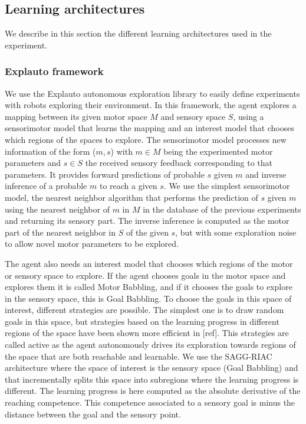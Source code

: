 \documentclass[10pt,letterpaper]{article}
\begin{document}
		
	
	\subsection{Learning architectures}

		We describe in this section the different learning architectures used in the experiment. 
		
		\subsubsection{Explauto framework}
			
			We use the Explauto autonomous exploration library \cite{moulin-frier_explauto:_2014} to easily define experiments with robots exploring their environment. 
			In this framework, the agent explores a mapping between its given motor space $M$ and sensory space $S$, 
			using a sensorimotor model that learns the mapping and an interest model that chooses which regions of the spaces to explore.
			The sensorimotor model processes new information of the form ($m, s$) with $m \in M$ being the experimented motor parameters and $s \in S$ the received sensory feedback 
			corresponding to that parameters. 
			It provides forward predictions of probable $s$ given $m$ and inverse inference of a probable $m$ to reach a given $s$.
			We use the simplest sensorimotor model, the nearest neighbor algorithm 
			that performs the prediction of $s$ given $m$ using the nearest neighbor of $m$ in $M$ in the database of the previous experiments and returning its sensory part. 
			The inverse inference is computed as the motor part of the nearest neighbor in $S$ of the given $s$, but with some exploration noise to allow novel motor parameters to be explored.
			
			The agent also needs an interest model that chooses which regions of the motor or sensory space to explore.
			If the agent chooses goals in the motor space and explores them it is called Motor Babbling, and if it chooses the goals to explore in the sensory space, this is Goal Babbling.
			To choose the goals in this space of interest, different strategies are possible. 
			The simplest one is to draw random goals in this space, but strategies based on the learning progress in different regions of the space have been shown more efficient in [ref].
			This strategies are called active as the agent autonomously drives its exploration towards regions of the space that are both reachable and learnable. 
			We use the SAGG-RIAC architecture \cite{baranes_active_2013} where the space of interest is the sensory space (Goal Babbling) and that incrementally splits this space into subregions where the learning progress 
			is different. 
			The learning progress is here computed as the absolute derivative of the reaching competence. 
			This competence associated to a sensory goal is minus the distance between the goal and the sensory point.
			
\end{document}
